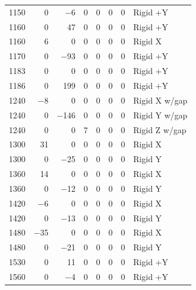 \begin{longtable}{lrrrrrrl}
    1150 & \num{0} & \num{-6} & \num{0} & \num{0} & \num{0} & \num{0} & Rigid +Y \\
    1160 & \num{0} & \num{47} & \num{0} & \num{0} & \num{0} & \num{0} & Rigid +Y \\
    1160 & \num{6} & \num{0} & \num{0} & \num{0} & \num{0} & \num{0} & Rigid X \\
    1170 & \num{0} & \num{-93} & \num{0} & \num{0} & \num{0} & \num{0} & Rigid +Y \\
    1183 & \num{0} & \num{0} & \num{0} & \num{0} & \num{0} & \num{0} & Rigid +Y \\
    1186 & \num{0} & \num{199} & \num{0} & \num{0} & \num{0} & \num{0} & Rigid +Y \\
    1240 & \num{-8} & \num{0} & \num{0} & \num{0} & \num{0} & \num{0} & Rigid X w/gap \\
    1240 & \num{0} & \num{-146} & \num{0} & \num{0} & \num{0} & \num{0} & Rigid Y w/gap \\
    1240 & \num{0} & \num{0} & \num{7} & \num{0} & \num{0} & \num{0} & Rigid Z w/gap \\
    1300 & \num{31} & \num{0} & \num{0} & \num{0} & \num{0} & \num{0} & Rigid X \\
    1300 & \num{0} & \num{-25} & \num{0} & \num{0} & \num{0} & \num{0} & Rigid Y \\
    1360 & \num{14} & \num{0} & \num{0} & \num{0} & \num{0} & \num{0} & Rigid X \\
    1360 & \num{0} & \num{-12} & \num{0} & \num{0} & \num{0} & \num{0} & Rigid Y \\
    1420 & \num{-6} & \num{0} & \num{0} & \num{0} & \num{0} & \num{0} & Rigid X \\
    1420 & \num{0} & \num{-13} & \num{0} & \num{0} & \num{0} & \num{0} & Rigid Y \\
    1480 & \num{-35} & \num{0} & \num{0} & \num{0} & \num{0} & \num{0} & Rigid X \\
    1480 & \num{0} & \num{-21} & \num{0} & \num{0} & \num{0} & \num{0} & Rigid Y \\
    1530 & \num{0} & \num{11} & \num{0} & \num{0} & \num{0} & \num{0} & Rigid +Y \\
    1560 & \num{0} & \num{-4} & \num{0} & \num{0} & \num{0} & \num{0} & Rigid +Y \\
\end{longtable}
\endgroup
